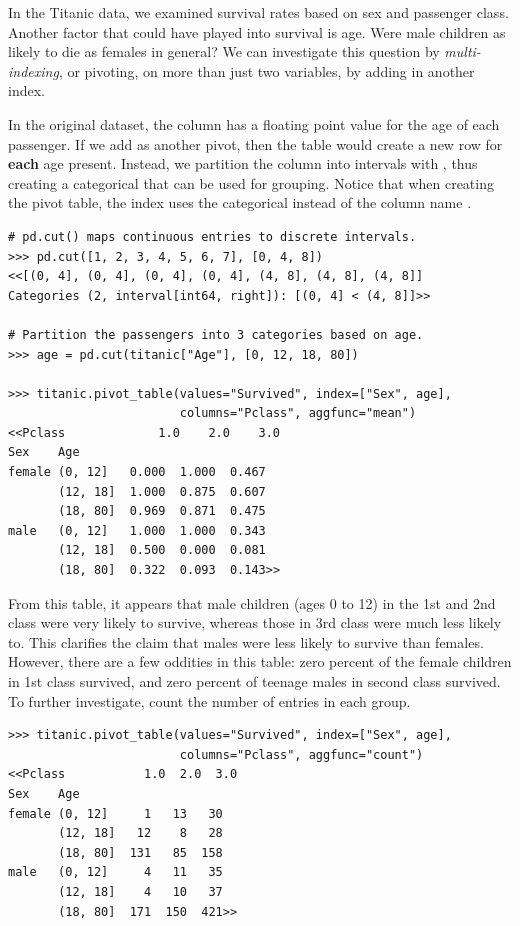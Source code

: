 In the Titanic data, we examined survival rates based on sex and passenger class.
Another factor that could have played into survival is age.
Were male children as likely to die as females in general?
We can investigate this question by \emph{multi-indexing}, or pivoting, on more than just two variables, by adding in another index.

In the original dataset, the  column has a floating point value for the age of each passenger.
If we add  as another pivot, then the table would create a new row for \textbf{each} age present.
Instead, we partition the  column into intervals with , thus creating a categorical that can be used for grouping.
Notice that when creating the pivot table, the index uses the categorical  instead of the column name .

\begin{lstlisting}
# pd.cut() maps continuous entries to discrete intervals.
>>> pd.cut([1, 2, 3, 4, 5, 6, 7], [0, 4, 8])
<<[(0, 4], (0, 4], (0, 4], (0, 4], (4, 8], (4, 8], (4, 8]]
Categories (2, interval[int64, right]): [(0, 4] < (4, 8]]>>

# Partition the passengers into 3 categories based on age.
>>> age = pd.cut(titanic["Age"], [0, 12, 18, 80])

>>> titanic.pivot_table(values="Survived", index=["Sex", age],
                        columns="Pclass", aggfunc="mean")
<<Pclass             1.0    2.0    3.0
Sex    Age
female (0, 12]   0.000  1.000  0.467
       (12, 18]  1.000  0.875  0.607
       (18, 80]  0.969  0.871  0.475
male   (0, 12]   1.000  1.000  0.343
       (12, 18]  0.500  0.000  0.081
       (18, 80]  0.322  0.093  0.143>>
\end{lstlisting}

From this table, it appears that male children (ages 0 to 12) in the 1st and 2nd class were very likely to survive, whereas those in 3rd class were much less likely to.
This clarifies the claim that males were less likely to survive than females.
However, there are a few oddities in this table: zero percent of the female children in 1st class survived, and zero percent of teenage males in second class survived.
To further investigate, count the number of entries in each group.

\begin{lstlisting}
>>> titanic.pivot_table(values="Survived", index=["Sex", age],
                        columns="Pclass", aggfunc="count")
<<Pclass           1.0  2.0  3.0
Sex    Age
female (0, 12]     1   13   30
       (12, 18]   12    8   28
       (18, 80]  131   85  158
male   (0, 12]     4   11   35
       (12, 18]    4   10   37
       (18, 80]  171  150  421>>
\end{lstlisting}

